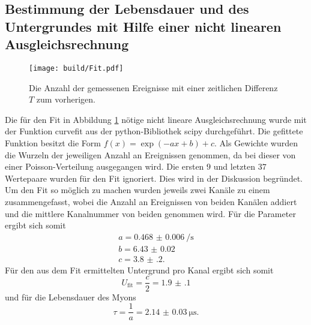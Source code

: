 \subsection{Bestimmung der Lebensdauer und des Untergrundes mit Hilfe einer nicht linearen Ausgleichsrechnung}
\label{subsec:Ausgleichs}
\begin{figure}
	\centering
	\texttt{[image: build/Fit.pdf]}
	\caption{Die Anzahl der gemessenen Ereignisse mit einer zeitlichen Differenz $T$ zum vorherigen.}
	\label{fig:zweite}
\end{figure}
Die für den Fit in Abbildung \ref{fig:zweite} nötige nicht lineare Ausgleichsrechnung wurde mit der Funktion curvefit aus der python-Bibliothek scipy \cite{scipy} durchgeführt. Die gefittete Funktion besitzt die Form $f(x)=\exp(-a x +b)+c$. Als Gewichte wurden die Wurzeln der jeweiligen Anzahl an Ereignissen genommen, da bei dieser von einer Poisson-Verteilung ausgegangen wird. Die ersten $9$ und letzten $37$ Wertepaare wurden für den Fit ignoriert. Dies wird in der Diskussion begründet. Um den Fit so möglich zu machen wurden jeweils zwei Kanäle zu einem zusammengefasst, wobei die Anzahl an Ereignissen von beiden Kanälen addiert und die mittlere Kanalnummer von beiden genommen wird. %
Für die Parameter ergibt sich somit
\begin{gather*}
a=\SI{0.468(6)}{\per\second}\\
b=\num{6.43(2)}\\
c=\num{3.8(2)}.
\end{gather*}
Für den aus dem Fit ermittelten Untergrund pro Kanal ergibt sich somit
\begin{displaymath}
	U_\text{fit}=\frac{c}{2}=\num{1.9(1)}
\end{displaymath}
und für die Lebensdauer des Myons
\begin{displaymath}
	\tau=\frac{1}{a}=\SI{2.14(3)}{\micro\second}.
\end{displaymath}